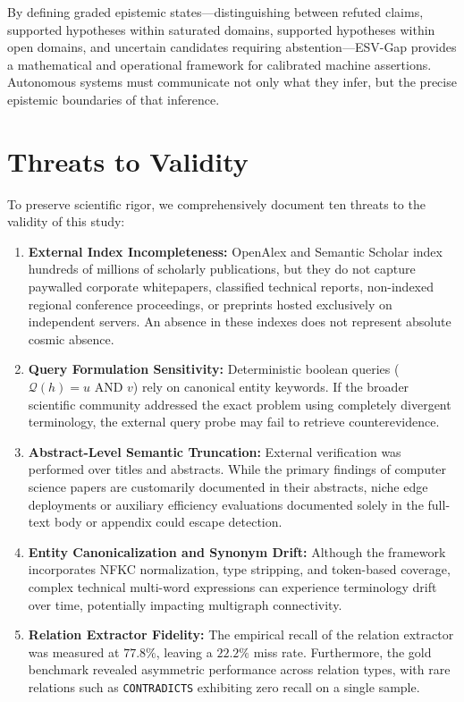 \documentclass[conference,10pt]{IEEEtran}
\newcommand{\method}{ESV-Gap}
\begin{document}
By defining graded epistemic states---distinguishing between refuted claims, supported hypotheses within saturated domains, supported hypotheses within open domains, and uncertain candidates requiring abstention---\method{} provides a mathematical and operational framework for calibrated machine assertions. Autonomous systems must communicate not only what they infer, but the precise epistemic boundaries of that inference.

\section{Threats to Validity}
\label{sec:threats}

To preserve scientific rigor, we comprehensively document ten threats to the validity of this study:
\begin{enumerate}[label=\arabic*),leftmargin=1.8em]
  \item \textbf{External Index Incompleteness:} OpenAlex and Semantic Scholar index hundreds of millions of scholarly publications, but they do not capture paywalled corporate whitepapers, classified technical reports, non-indexed regional conference proceedings, or preprints hosted exclusively on independent servers. An absence in these indexes does not represent absolute cosmic absence.
  \item \textbf{Query Formulation Sensitivity:} Deterministic boolean queries ($\mathcal{Q}(h) = u \text{ AND } v$) rely on canonical entity keywords. If the broader scientific community addressed the exact problem using completely divergent terminology, the external query probe may fail to retrieve counterevidence.
  \item \textbf{Abstract-Level Semantic Truncation:} External verification was performed over titles and abstracts. While the primary findings of computer science papers are customarily documented in their abstracts, niche edge deployments or auxiliary efficiency evaluations documented solely in the full-text body or appendix could escape detection.
  \item \textbf{Entity Canonicalization and Synonym Drift:} Although the framework incorporates NFKC normalization, type stripping, and token-based coverage, complex technical multi-word expressions can experience terminology drift over time, potentially impacting multigraph connectivity.
  \item \textbf{Relation Extractor Fidelity:} The empirical recall of the relation extractor was measured at $77.8\%$, leaving a $22.2\%$ miss rate. Furthermore, the gold benchmark revealed asymmetric performance across relation types, with rare relations such as \texttt{CONTRADICTS} exhibiting zero recall on a single sample.

\end{enumerate}
\end{document}
